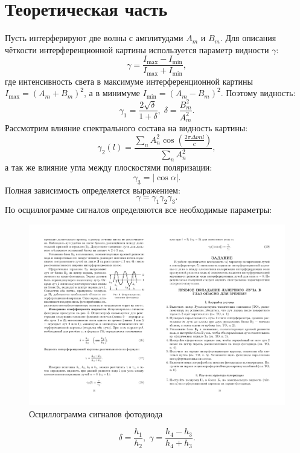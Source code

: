 \documentclass[a4paper,12pt]{article} %
\begin{document}
\section{Теоретическая часть}
	Пусть интерферируют две волны с амплитудами $A_m $ и $ B_m$. Для описания чёткости интерференционной картины используется параметр видности $ \gamma $:
	\begin{equation}
	\gamma=\frac{I_{\max }-I_{\min }}{I_{\max }+I_{\min }}, 
	\end{equation}
	где интенсивность света в максимуме интерференционной картины $  I_{\max } = (A_m + B_m )^2$, а в минимуме $  I_{\min } = (A_m - B_m )^2 $. Поэтому видность:
	\begin{equation}
	\gamma_{1}=\frac{2 \sqrt{\delta}}{1+\delta}, \; \delta = \frac{B_m^2}{A_m^2}.
	\end{equation}
	Рассмотрим влияние спектрального состава на видность картины:
	\begin{equation}
	\gamma_{2}(l)=\frac{\sum\limits_{n} A_{n}^{2} \cos \left(\frac{2 \pi \Delta \nu n l}{c}\right)}{\sum\limits_{n} A_{n}^{2}},
	\end{equation}
	а так же влияние угла между плоскостями поляризации:
	\begin{equation}
	\gamma_3 = |\cos\alpha|.
	\end{equation}
	Полная зависимость определяется выражением:
	\begin{equation}
	\gamma = \gamma_1\gamma_2\gamma_3.
	\end{equation}
	По осциллограмме сигналов определяются все необходимые параметры:
	\begin{figure}[H]
		\caption{Осциллограмма сигналов фотодиода}
		\label{1}
		\includegraphics[scale=1.5]{1.pdf}
	\end{figure}
	\begin{equation}
	\delta = \frac{h_1}{h_2}, \; \gamma = \frac{h_4-h_3}{h_4+h_3}.
	\end{equation}	
	
\end{document}
